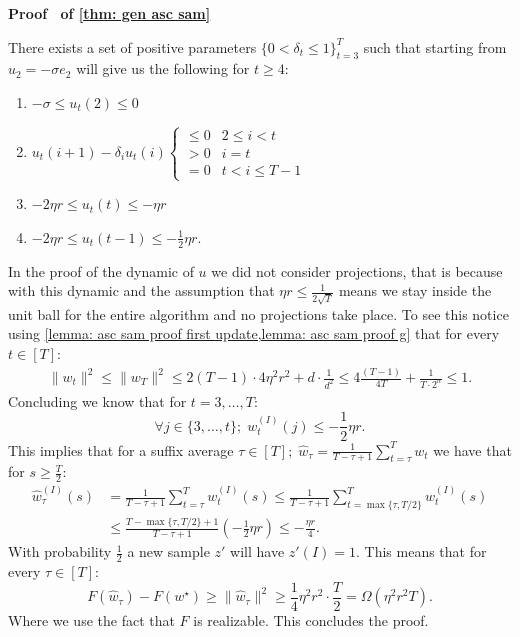 \documentclass[11pt]{article}
\newcommand{\rad}{r}
\renewenvironment{proof}[1][]{%
  \par\noindent\textbf{\upshape Proof%
  \if\relax\detokenize{#1}\relax\else\ #1\fi}\ %
}{\jmlrQED}
\begin{document}
\begin{proof}[of \cref{thm: gen asc sam}]
\begin{lemma}\label{lemma: asc sam proof g}
    There exists a set of positive parameters $\{0 < \delta_t \leq 1\}_{t=3}^T$ such that starting from $u_2 = -\sigma e_2$ will give us the following for $t \geq 4$:
    \begin{enumerate}
    \item $- \sigma \leq u_t(2) \leq 0$
    \item  $u_t(i+1) - \delta_i u_t(i)  \begin{cases}
        \leq 0 & 2 \leq i < t \\
        > 0 & i = t \\
        = 0 & t < i \leq T-1
    \end{cases}$
    \item $-2\eta\rad  \leq u_{t}(t) \leq - \eta \rad$
    \item $-2\eta\rad  \leq  u_{t}(t-1) \leq -\frac{1}{2} \eta \rad$.
\end{enumerate}
\end{lemma}

In the proof of the dynamic of $u$ we did not consider projections, that is because with this dynamic and the assumption that $\eta\rad\leq \frac{1}{2\sqrt{T}}$ means we stay inside the unit ball for the entire algorithm and no projections take place. To see this notice using \cref{lemma: asc sam proof first update,lemma: asc sam proof g} that for every $t\in [T]$:
\begin{align*}
    \|w_t\|^2 \leq \|w_T\|^2 \leq 2(T-1) \cdot 4 \eta^2 \rad^2 + d \cdot \frac{1}{d^2} \leq 4\frac{(T-1)}{4T} + \frac{1}{T \cdot 2^n} \leq 1.
\end{align*}
Concluding we know that for $t = 3, \dots, T$:
$$\forall j \in \{3,\dots, t\} ;\; w_t^{(I)}(j) \leq -\frac{1}{2} \eta \rad.$$
This implies that for a suffix average $\tau\in [T];\; \widehat{w}_{\tau} = \frac{1}{T-\tau+1} \sum_{t=\tau}^T w_t$ we have that for $s \geq \frac{T}{2}$:
\begin{align*}
    \widehat{w}_{\tau}^{(I)}(s) & = \frac{1}{T-\tau+1}\sum_{t = \tau}^T w_t^{(I)}(s) \leq \frac{1}{T-\tau+1}\sum_{t = \max\{\tau, T/2\}}^T w_t^{(I)}(s) \\
    & \leq \frac{T - \max\{\tau, T/2\} +1}{T - \tau + 1} \left(-\frac{1}{2}\eta \rad \right) \leq - \frac{\eta \rad}{4}.
\end{align*}
With probability $\frac{1}{2}$ a new sample $z'$ will have $z'(I) = 1$. This means that for every $\tau \in [T]$: 
$$F(\widehat{w}_{\tau}) - F(w^{\star}) \geq \|\widehat{w}_{\tau}\|^2 \geq \frac{1}{4} \eta^2 \rad^2 \cdot \frac{T}{2} = \Omega(\eta^2\rad^2T).$$
Where we use the fact that $F$ is realizable. This concludes the proof.
\end{proof}
\end{document}
